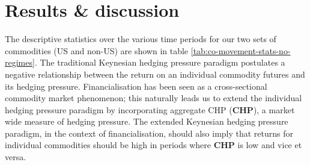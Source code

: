 \documentclass[]{elsarticle} %
\begin{document}
\cleardoublepage

\hypertarget{co-movement-results}{%
\section{Results \& discussion}\label{co-movement-results}}

The descriptive statistics over the various time periods for our two sets of commodities (US and non-US) are shown in table \ref{tab:co-movement-stats-no-regimes}. The traditional Keynesian hedging pressure paradigm postulates a negative relationship between the return on an individual commodity futures and its hedging pressure. Financialisation has been seen as a cross-sectional commodity market phenomenon; this naturally leads us to extend the individual hedging pressure paradigm by incorporating aggregate CHP (\textbf{CHP}), a market wide measure of hedging pressure. The extended Keynesian hedging pressure paradigm, in the context of financialisation, should also imply that returns for individual commodities should be high in periods where \textbf{CHP} is low and vice et versa.
\end{document}
